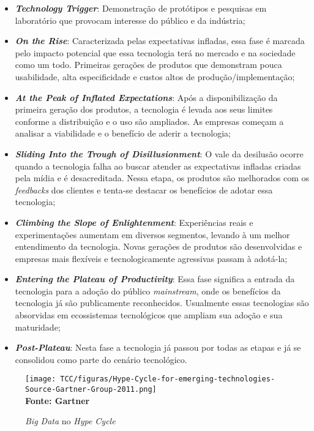 \begin{itemize}
\item \textbf{\textit{Technology Trigger}}: Demonstração de protótipos e pesquisas em laboratório que provocam interesse do público e da indústria;
\item \textbf{\textit{On the Rise}}: Caracterizada pelas expectativas infladas, essa fase é marcada pelo impacto potencial que essa tecnologia terá no mercado e na sociedade como um todo. Primeiras gerações de produtos que demonstram pouca usabilidade, alta especificidade e custos altos de produção/implementação;
\item \textbf{\textit{At the Peak of Inflated Expectations}}: Após a disponibilização da primeira geração dos produtos, a tecnologia é levada aos seus limites conforme a distribuição e o uso são ampliados. As empresas começam a analisar a viabilidade e o benefício de aderir a tecnologia;
\item \textbf{\textit{Sliding Into the Trough of Disillusionment}}: O vale da desilusão ocorre quando a tecnologia falha ao buscar atender as expectativas infladas criadas pela mídia e é desacreditada. Nessa etapa, os produtos são melhorados com os \textit{feedbacks} dos clientes e tenta-se destacar os benefícios de adotar essa tecnologia;
\item \textbf{\textit{Climbing the Slope of Enlightenment}}: Experiências reais e experimentações aumentam em diversos segmentos, levando à um melhor entendimento da tecnologia. Novas gerações de produtos são desenvolvidas e empresas mais flexíveis e tecnologicamente agressivas passam à adotá-la;
\item \textbf{\textit{Entering the Plateau of Productivity}}: Essa fase significa a entrada da tecnologia para a adoção do público \textit{mainstream}, onde os benefícios da tecnologia já são publicamente reconhecidos. Usualmente essas tecnologias são absorvidas em ecossistemas tecnológicos que ampliam sua adoção e sua maturidade; 
\item \textbf{\textit{Post-Plateau}}: Nesta fase a tecnologia já passou por todas as etapas e já se consolidou como parte do cenário tecnológico.
\end{itemize}


\begin{figure}[!ht]
	\centering	
	\caption[\hspace{0.1cm}\textit{Big Data} no \textit{Hype Cycle}]{\textit{Big Data} no \textit{Hype Cycle}}
	  \vspace{-0.4cm}
	\texttt{[image: TCC/figuras/Hype-Cycle-for-emerging-technologies-Source-Gartner-Group-2011.png]}
	 \vspace{-0.3cm}
	\\\textbf{\footnotesize Fonte: Gartner}
	\label{fig:tela1}
\end{figure}

